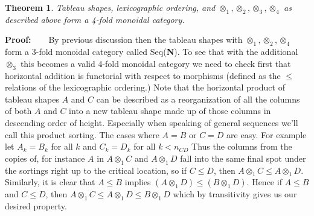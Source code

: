 \documentclass{tac}
\newtheorem{theorem}{Theorem}
\begin{document}
{\begin{enumerate}
\begin{theorem}
Tableau shapes, lexicographic ordering, and $\otimes_1, \otimes_2, \otimes_3, \otimes_4$
as described above form a 4-fold monoidal category.
\end{theorem}
{\bf Proof:~~~}
By previous discussion
then the tableau shapes with $\otimes_1, \otimes_2, \otimes_4$ form a 3-fold monoidal category
called Seq({\bf N}).
To see that with the additional $\otimes_3$ this becomes a valid 4-fold monoidal category  
we need to check first 
that horizontal addition is functorial with respect to morphisms (defined as the $\le$ relations 
of the lexicographic ordering.)  
Note that the horizontal product of tableau shapes $A$ and $C$ can be described as
a reorganization of all the columns of both $A$ and $C$ into a new tableau shape made up of those columns in
 descending order of height. 
 Especially when speaking of general sequences we'll call this product sorting.  The cases where
 $A=B$ or $C=D$ are easy. For example let $A_k = B_k$ for all $k$ and
$C_k = D_k$ for all $k < n_{CD}$ Thus the columns from the copies of, for instance $A$ in $A\otimes_1 C$ and 
$A\otimes_1 D$ fall into the same final spot under the sortings right up to the critical location, so
if $C \le D$, then $A\otimes_1 C \le A\otimes_1 D.$
Similarly, it is clear that $A \le B$ implies $(A \otimes_1 D) \le (B \otimes_1 D).$ 
Hence if $A\le B$ and $C\le D$, then
        $A\otimes_1 C \le A\otimes_1 D \le B\otimes_1 D$ which by transitivity gives us our desired property. 





\end{enumerate}}
\end{document}
